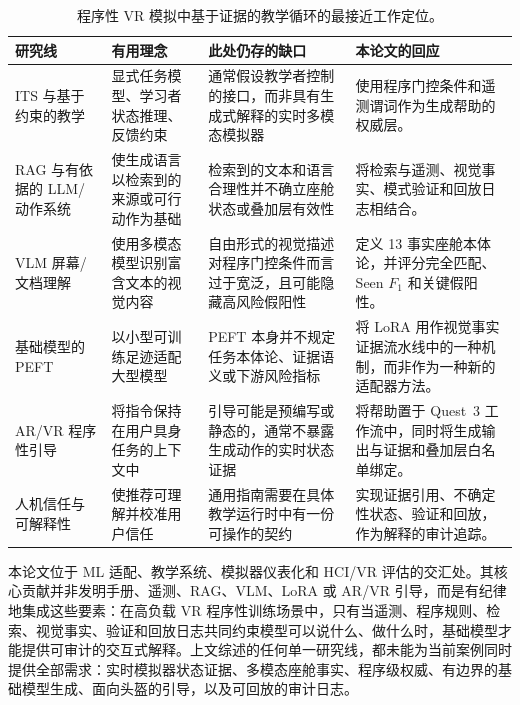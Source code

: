 \begin{table}[htbp]
\centering
\caption{程序性 VR 模拟中基于证据的教学循环的最接近工作定位。}
\label{tab:closest-work-gap}
\footnotesize
\renewcommand{\arraystretch}{1.08}
\begin{tabularx}{\textwidth}{@{}YYYY@{}}
\toprule
\textbf{研究线} & \textbf{有用理念} &
\textbf{此处仍存的缺口} & \textbf{本论文的回应} \\
\midrule
ITS 与基于约束的教学 &
显式任务模型、学习者状态推理、反馈约束 &
通常假设教学者控制的接口，而非具有生成式解释的实时多模态模拟器 &
使用程序门控条件和遥测谓词作为生成帮助的权威层。 \\
\addlinespace
RAG 与有依据的 LLM/动作系统 &
使生成语言以检索到的来源或可行动作为基础 &
检索到的文本和语言合理性并不确立座舱状态或叠加层有效性 &
将检索与遥测、视觉事实、模式验证和回放日志相结合。 \\
\addlinespace
VLM 屏幕/文档理解 &
使用多模态模型识别富含文本的视觉内容 &
自由形式的视觉描述对程序门控条件而言过于宽泛，且可能隐藏高风险假阳性 &
定义 13 事实座舱本体论，并评分完全匹配、Seen \(F_1\) 和关键假阳性。 \\
\addlinespace
基础模型的 PEFT &
以小型可训练足迹适配大型模型 &
PEFT 本身并不规定任务本体论、证据语义或下游风险指标 &
将 LoRA 用作视觉事实证据流水线中的一种机制，而非作为一种新的适配器方法。 \\
\addlinespace
AR/VR 程序性引导 &
将指令保持在用户具身任务的上下文中 &
引导可能是预编写或静态的，通常不暴露生成动作的实时状态证据 &
将帮助置于 Quest~3 工作流中，同时将生成输出与证据和叠加层白名单绑定。 \\
\addlinespace
人机信任与可解释性 &
使推荐可理解并校准用户信任 &
通用指南需要在具体教学运行时中有一份可操作的契约 &
实现证据引用、不确定性状态、验证和回放，作为解释的审计追踪。 \\
\bottomrule
\end{tabularx}
\end{table}

本论文位于 ML 适配、教学系统、模拟器仪表化和 HCI/VR 评估的交汇处。其核心贡献并非发明手册、遥测、RAG、VLM、LoRA 或 AR/VR 引导，而是有纪律地集成这些要素：在高负载 VR 程序性训练场景中，只有当遥测、程序规则、检索、视觉事实、验证和回放日志共同约束模型可以说什么、做什么时，基础模型才能提供可审计的交互式解释。上文综述的任何单一研究线，都未能为当前案例同时提供全部需求：实时模拟器状态证据、多模态座舱事实、程序级权威、有边界的基础模型生成、面向头盔的引导，以及可回放的审计日志。

